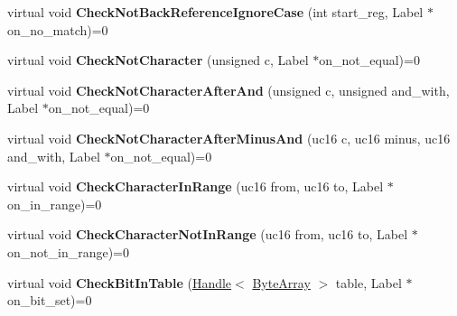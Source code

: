 \begin{DoxyCompactItemize}
\item 
\hypertarget{classv8_1_1internal_1_1_reg_exp_macro_assembler_ad21ca238769e89f6e63427ed8e4a6f46}{}virtual void {\bfseries Check\+Not\+Back\+Reference\+Ignore\+Case} (int start\+\_\+reg, Label $\ast$on\+\_\+no\+\_\+match)=0\label{classv8_1_1internal_1_1_reg_exp_macro_assembler_ad21ca238769e89f6e63427ed8e4a6f46}

\item 
\hypertarget{classv8_1_1internal_1_1_reg_exp_macro_assembler_ae8333c77adc1f824766f1b8450e7135d}{}virtual void {\bfseries Check\+Not\+Character} (unsigned c, Label $\ast$on\+\_\+not\+\_\+equal)=0\label{classv8_1_1internal_1_1_reg_exp_macro_assembler_ae8333c77adc1f824766f1b8450e7135d}

\item 
\hypertarget{classv8_1_1internal_1_1_reg_exp_macro_assembler_afca08e02faa3cddd9ab89ecd5505e28c}{}virtual void {\bfseries Check\+Not\+Character\+After\+And} (unsigned c, unsigned and\+\_\+with, Label $\ast$on\+\_\+not\+\_\+equal)=0\label{classv8_1_1internal_1_1_reg_exp_macro_assembler_afca08e02faa3cddd9ab89ecd5505e28c}

\item 
\hypertarget{classv8_1_1internal_1_1_reg_exp_macro_assembler_a6ec10ec5fa6560fa42fc8c473774852d}{}virtual void {\bfseries Check\+Not\+Character\+After\+Minus\+And} (uc16 c, uc16 minus, uc16 and\+\_\+with, Label $\ast$on\+\_\+not\+\_\+equal)=0\label{classv8_1_1internal_1_1_reg_exp_macro_assembler_a6ec10ec5fa6560fa42fc8c473774852d}

\item 
\hypertarget{classv8_1_1internal_1_1_reg_exp_macro_assembler_a873c96a4e121d2d86129085b086d3ced}{}virtual void {\bfseries Check\+Character\+In\+Range} (uc16 from, uc16 to, Label $\ast$on\+\_\+in\+\_\+range)=0\label{classv8_1_1internal_1_1_reg_exp_macro_assembler_a873c96a4e121d2d86129085b086d3ced}

\item 
\hypertarget{classv8_1_1internal_1_1_reg_exp_macro_assembler_a63f2f1fe5214dbbd5143dc25d3c25279}{}virtual void {\bfseries Check\+Character\+Not\+In\+Range} (uc16 from, uc16 to, Label $\ast$on\+\_\+not\+\_\+in\+\_\+range)=0\label{classv8_1_1internal_1_1_reg_exp_macro_assembler_a63f2f1fe5214dbbd5143dc25d3c25279}

\item 
\hypertarget{classv8_1_1internal_1_1_reg_exp_macro_assembler_a26238606beb5c4dd46ccf3bd08f400ac}{}virtual void {\bfseries Check\+Bit\+In\+Table} (\hyperlink{classv8_1_1internal_1_1_handle}{Handle}$<$ \hyperlink{classv8_1_1internal_1_1_byte_array}{Byte\+Array} $>$ table, Label $\ast$on\+\_\+bit\+\_\+set)=0\label{classv8_1_1internal_1_1_reg_exp_macro_assembler_a26238606beb5c4dd46ccf3bd08f400ac}


\end{DoxyCompactItemize}

